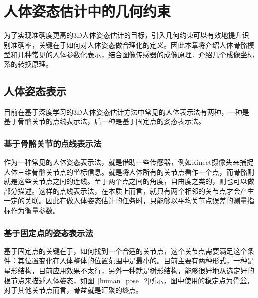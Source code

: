 
\chapter{人体姿态估计中的几何约束}

为了实现准确度更高的3D人体姿态估计的目标，引入几何约束可以有效地提升识别准确率，关键在于如何对人体姿态做合理化的定义。因此本章将介绍人体骨骼模型和几种常见的人体参数化表示，结合图像传感器的成像原理，介绍几个成像坐标系的转换原理。

\section{人体姿态表示}
目前在基于深度学习的3D人体姿态估计方法中常见的人体表示法有两种，一种是基于骨骼关节的点线表示法，后一种是基于固定点的姿态表示法。

\subsection{基于骨骼关节的点线表示法}

作为一种常见的人体姿态表示法，就是借助一些传感器，例如Kinect摄像头来捕捉人体三维骨骼关节点的坐标信息。就是将人体所有的关节点看作一个点，而骨骼则就是这些关节点之间的连线。至于两个点之间的角度，自由度之类的，则也可以做部分描述。这样的点线表示法，在本质上而言，就只有两个相邻的关节点才会产生一定的关联。因此在做人体姿态估计的任务时，只能够以平均关节点误差的测量指标作为衡量参数。

\subsection{基于固定点的姿态表示法}

基于固定点的关键在于，如何找到一个合适的关节点，这个关节点需要满足这个条件：其位置变化在人体整体的位置范围中是最小的。目前主要有两种形式，一种是星形结构，目前应用效果不太行，另外一种就是树形结构，能够很好地从选定好的根节点来描述人体姿态，如图~\ref{human_pose_2}所示，图中使用的稳定点为骨盆，对于其他关节点而言，骨盆就是汇聚的终点。

